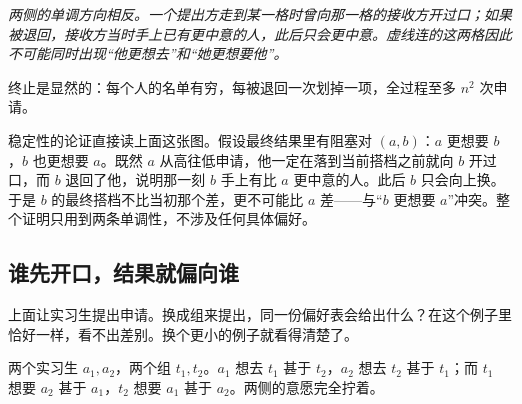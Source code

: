 \begin{center}

\emph{两侧的单调方向相反。一个提出方走到某一格时曾向那一格的接收方开过口；如果被退回，接收方当时手上已有更中意的人，此后只会更中意。虚线连的这两格因此不可能同时出现``他更想去''和``她更想要他''。}
\end{center}

终止是显然的：每个人的名单有穷，每被退回一次划掉一项，全过程至多 \(n^2\) 次申请。

稳定性的论证直接读上面这张图。假设最终结果里有阻塞对 \((a,b)\)：\(a\) 更想要 \(b\)，\(b\) 也更想要 \(a\)。既然 \(a\) 从高往低申请，他一定在落到当前搭档之前就向 \(b\) 开过口，而 \(b\) 退回了他，说明那一刻 \(b\) 手上有比 \(a\) 更中意的人。此后 \(b\) 只会向上换。于是 \(b\) 的最终搭档不比当初那个差，更不可能比 \(a\) 差——与``\(b\) 更想要 \(a\)''冲突。整个证明只用到两条单调性，不涉及任何具体偏好。

\subsection{谁先开口，结果就偏向谁}

上面让实习生提出申请。换成组来提出，同一份偏好表会给出什么？在这个例子里恰好一样，看不出差别。换个更小的例子就看得清楚了。

两个实习生 \(a_1,a_2\)，两个组 \(t_1,t_2\)。\(a_1\) 想去 \(t_1\) 甚于 \(t_2\)，\(a_2\) 想去 \(t_2\) 甚于 \(t_1\)；而 \(t_1\) 想要 \(a_2\) 甚于 \(a_1\)，\(t_2\) 想要 \(a_1\) 甚于 \(a_2\)。两侧的意愿完全拧着。

